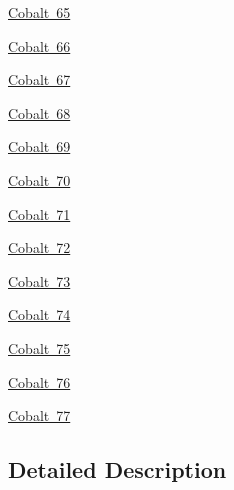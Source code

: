 \begin{DoxyCompactItemize}
\mbox{\hyperlink{group___isotope_const-_cobalt-_co65}{Cobalt 65}}
\item 
\mbox{\hyperlink{group___isotope_const-_cobalt-_co66}{Cobalt 66}}
\item 
\mbox{\hyperlink{group___isotope_const-_cobalt-_co67}{Cobalt 67}}
\item 
\mbox{\hyperlink{group___isotope_const-_cobalt-_co68}{Cobalt 68}}
\item 
\mbox{\hyperlink{group___isotope_const-_cobalt-_co69}{Cobalt 69}}
\item 
\mbox{\hyperlink{group___isotope_const-_cobalt-_co70}{Cobalt 70}}
\item 
\mbox{\hyperlink{group___isotope_const-_cobalt-_co71}{Cobalt 71}}
\item 
\mbox{\hyperlink{group___isotope_const-_cobalt-_co72}{Cobalt 72}}
\item 
\mbox{\hyperlink{group___isotope_const-_cobalt-_co73}{Cobalt 73}}
\item 
\mbox{\hyperlink{group___isotope_const-_cobalt-_co74}{Cobalt 74}}
\item 
\mbox{\hyperlink{group___isotope_const-_cobalt-_co75}{Cobalt 75}}
\item 
\mbox{\hyperlink{group___isotope_const-_cobalt-_co76}{Cobalt 76}}
\item 
\mbox{\hyperlink{group___isotope_const-_cobalt-_co77}{Cobalt 77}}
\end{DoxyCompactItemize}


\subsection{Detailed Description}
